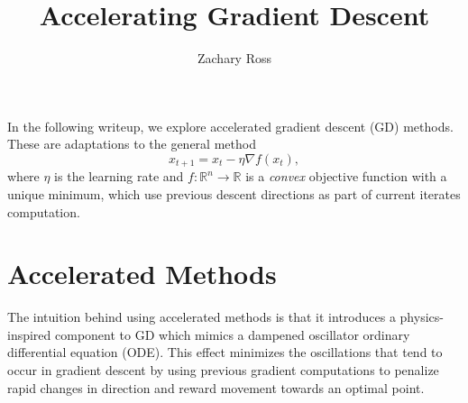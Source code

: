 \documentclass{article}
\title{Accelerating Gradient Descent}
\author{Zachary Ross}
\newcommand{\R}{\mathbb R}
\begin{document}
\maketitle

In the following writeup, we explore accelerated gradient descent (GD) methods. These
are adaptations to the general method
\begin{equation}
    \label{eq:gd}
    x_{t + 1} = x_t - \eta \nabla f(x_t),
\end{equation} where $\eta$ is the learning rate and $f: \R^n \rightarrow \R$ is
a \emph{convex} objective function with a unique minimum, which use previous
descent directions as part of current iterates computation. 

\section{Accelerated Methods}

The intuition behind using accelerated methods is that it introduces a
physics-inspired component to GD which mimics a dampened oscillator ordinary
differential equation (ODE). This effect minimizes the oscillations that tend to
occur in gradient descent by using previous gradient computations to penalize
rapid changes in direction and reward movement towards an optimal point.
\end{document}
